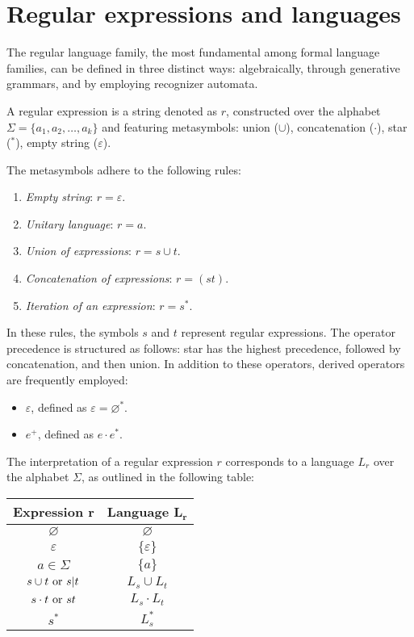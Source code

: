 \section{Regular expressions and languages}

The regular language family, the most fundamental among formal language families, can be defined in three distinct ways: algebraically, through generative grammars, and by employing recognizer automata.
\begin{definition}
    A regular expression is a string denoted as $r$, constructed over the alphabet $\Sigma=\{a_1,a_2,\dots,a_k\}$ and featuring metasymbols: union ($\cup$), concatenation ($\cdot$), star ($^{*}$), empty string ($\varepsilon$). 
\end{definition}
The metasymbols adhere to the following rules:
\begin{enumerate}
    \item \textit{Empty string}: $r=\varepsilon$.
    \item \textit{Unitary language}: $r=a$.
    \item \textit{Union of expressions}: $r=s \cup t$.
    \item \textit{Concatenation of expressions}: $r=(st)$.
    \item \textit{Iteration of an expression}: $r=s^{*}$. 
\end{enumerate}
In these rules, the symbols $s$ and $t$ represent regular expressions. 
The operator precedence is structured as follows: star has the highest precedence, followed by concatenation, and then union.
In addition to these operators, derived operators are frequently employed:
\begin{itemize}
    \item $\varepsilon$, defined as $\varepsilon=\varnothing^{*}$. 
    \item $e^{+}$, defined as $e \cdot e^{*}$. 
\end{itemize}
The interpretation of a regular expression $r$ corresponds to a language $L_r$ over the alphabet $\Sigma$, as outlined in the following table:
\begin{table}[H]
    \centering
    \begin{tabular}{cc}
    \hline
    \textbf{Expression $\boldsymbol{r}$} & \textbf{Language $\boldsymbol{L_r}$} \\ \hline
    $\varnothing$                        & $\varnothing$                        \\
    $\varepsilon$                        & $\{\varepsilon\}$                    \\
    $a \in \Sigma$                       & $\{a\}$                              \\
    $s \cup t \textnormal{ or } s|t$     & $L_s \cup L_t$                       \\
    $s \cdot t \textnormal{ or } st$     & $L_s \cdot L_t$                      \\
    $s^{*}$                              & $L_s^{*}$                            \\ \hline
    \end{tabular}
\end{table}
